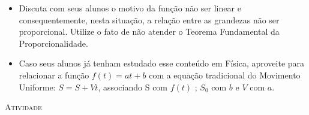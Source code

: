 \documentclass[10 pt,usenames,dvipsnames, oneside]{article}
\begin{document}
\begin{goals}
\begin{itemize}
\begin{figure}[H]

\end{figure}


\item Discuta com seus alunos o motivo da função não ser linear e consequentemente, nesta situação, a relação entre as grandezas não ser proporcional. Utilize o fato de não atender o Teorema Fundamental da Proporcionalidade.

\item Caso seus alunos já tenham estudado esse conteúdo em Física, aproveite para relacionar a função $f(t)=at+b$ com a equação tradicional do Movimento Uniforme: $S=S+Vt$, associando S com $f(t)$ ; $S_0$ com $b$ e $V$ com $a$.
 
\end{itemize}
\end{goals}

\bigskip
\begin{center}
{\large \scshape Atividade}
\end{center}
\fi
\end{document}
